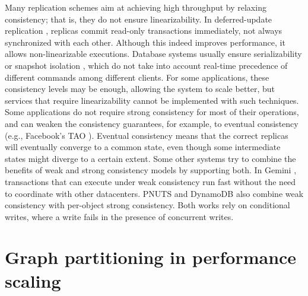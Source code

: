 Many replication schemes aim at achieving high throughput by relaxing
consistency; that is, they do not ensure linearizability. In deferred-update
replication \cite{chundi96dur, kobus2013hybrid, sciascia2012sdur, SousaOMP01},
replicas commit read-only transactions immediately, not always synchronized
with each other. Although this indeed improves performance, it allows
non-linearizable executions. Database systems usually ensure serializability
\cite{BHG87} or snapshot isolation \cite{LinKJPA09}, which do not take into
account real-time precedence of different commands among different clients. For
some applications, these consistency levels may be enough, allowing the system
to scale better, but services that require linearizability cannot be implemented
with such techniques. Some applications do not require strong consistency for
most of their operations, and can weaken the consistency guarantees, for example, to eventual
consistency (e.g., Facebook's TAO \cite{facebookTAO}). Eventual consistency
\cite{gustavsson2002self} means that the correct replicas will eventually
converge to a common state, even though some intermediate states might diverge
to a certain extent. Some other systems try to combine the benefits of weak and
strong consistency models by supporting both.  In Gemini \cite{Li2012geo},
transactions that can execute under weak consistency run fast without the need
to coordinate with other datacenters. PNUTS \cite{Cooper2008PNUTSYH} and
DynamoDB \cite{Sivasubramanian:2012dynamo} also combine weak consistency with
per-object strong consistency. Both works rely on conditional writes, where a
write fails in the presence of concurrent writes.

\section{Graph partitioning in performance scaling}

